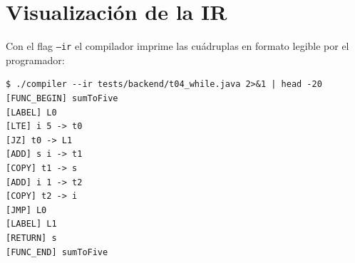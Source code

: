 \section{Visualización de la IR}

Con el flag \texttt{--ir} el compilador imprime las cuádruplas en formato
legible por el programador:

\begin{verbatim}
$ ./compiler --ir tests/backend/t04_while.java 2>&1 | head -20
[FUNC_BEGIN] sumToFive
[LABEL] L0
[LTE] i 5 -> t0
[JZ] t0 -> L1
[ADD] s i -> t1
[COPY] t1 -> s
[ADD] i 1 -> t2
[COPY] t2 -> i
[JMP] L0
[LABEL] L1
[RETURN] s
[FUNC_END] sumToFive
\end{verbatim}
